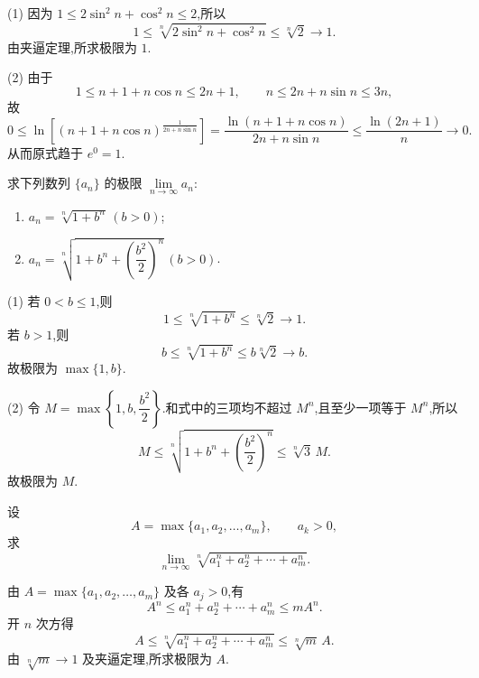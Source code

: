 \begin{solution}
  
  (1) 因为 $1\leq2\sin^2n+\cos^2n\leq2$,所以
  \[
    1\leq\sqrt[n]{2\sin^2n+\cos^2n}\leq\sqrt[n]{2}\longrightarrow1.
  \]
  由夹逼定理,所求极限为 $1$.

  (2) 由于
  \[
    1\leq n+1+n\cos n\leq2n+1,
    \qquad
    n\leq2n+n\sin n\leq3n,
  \]
  故
  \[
    0\leq
    \ln\left[(n+1+n\cos n)^{\frac{1}{2n+n\sin n}}\right]
    =\dfrac{\ln(n+1+n\cos n)}{2n+n\sin n}
    \leq\dfrac{\ln(2n+1)}{n}\longrightarrow0.
  \]
  从而原式趋于 $e^0=1$.
\end{solution}

\begin{example}
  求下列数列 $\{a_n\}$ 的极限 $\displaystyle \lim\limits_{n\to\infty}a_n$:
  \begin{enumerate}
    \item $\displaystyle a_n=\sqrt[n]{1+b^n}\,(b>0)$;
    \item $\displaystyle a_n=\sqrt[n]{1+b^n+\left(\dfrac{b^2}{2}\right)^n}\,(b>0)$.
  \end{enumerate}
\end{example}
\exampleblank

\begin{solution}

  (1) 若 $0<b\leq1$,则
  \[
    1\leq\sqrt[n]{1+b^n}\leq\sqrt[n]{2}\longrightarrow1.
  \]
  若 $b>1$,则
  \[
    b\leq\sqrt[n]{1+b^n}\leq b\sqrt[n]{2}\longrightarrow b.
  \]
  故极限为 $\max\{1,b\}$.

  (2) 令 $M=\max\left\{1,b,\dfrac{b^2}{2}\right\}$.和式中的三项均不超过 $M^n$,且至少一项等于
  $M^n$,所以
  \[
    M\leq\sqrt[n]{1+b^n+\left(\dfrac{b^2}{2}\right)^n}
    \leq\sqrt[n]{3}\,M.
  \]
  故极限为 $M$.
\end{solution}

\begin{example}[\markstar]
  设
  \[
    A=\max\{a_1,a_2,\ldots,a_m\},\qquad a_k>0,
  \]
  求
  \[
    \displaystyle\lim\limits_{n\to\infty}\sqrt[n]{a_1^n+a_2^n+\cdots+a_m^n}.
  \]
\end{example}
\exampleblank

\begin{solution}
  由 $A=\max\{a_1,a_2,\ldots,a_m\}$ 及各 $a_j>0$,有
  \[
    A^n\leq a_1^n+a_2^n+\cdots+a_m^n\leq mA^n.
  \]
  开 $n$ 次方得
  \[
    A\leq\sqrt[n]{a_1^n+a_2^n+\cdots+a_m^n}\leq\sqrt[n]{m}\,A.
  \]
  由 $\sqrt[n]{m}\to1$ 及夹逼定理,所求极限为 $A$.
\end{solution}

